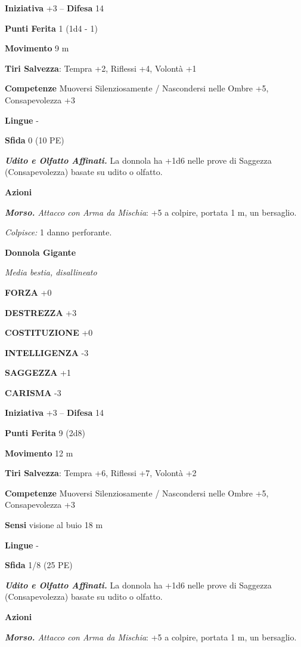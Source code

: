 \begin{multicols}{2}
\textbf{Iniziativa} +3 -- \textbf{Difesa} 14

\textbf{Punti Ferita} 1 (1d4 - 1)

\textbf{Movimento} 9 m

\textbf{Tiri Salvezza}: Tempra +2, Riflessi +4, Volontà +1

\textbf{Competenze} Muoversi Silenziosamente / Nascondersi nelle Ombre +5, Consapevolezza +3

\textbf{Lingue} -

\textbf{Sfida} 0 (10 PE)

\emph{\textbf{Udito e Olfatto Affinati.}} La donnola ha +1d6 nelle prove di Saggezza (Consapevolezza) basate su udito o olfatto.

\textbf{Azioni}

\emph{\textbf{Morso.} Attacco con Arma da Mischia}: +5 a colpire, portata 1 m, un bersaglio.

\emph{Colpisce:} 1 danno perforante.

\medskip\textbf{Donnola Gigante}

\emph{Media bestia, disallineato}

\textbf{FORZA} +0

\textbf{DESTREZZA} +3

\textbf{COSTITUZIONE} +0

\textbf{INTELLIGENZA} -3

\textbf{SAGGEZZA} +1

\textbf{CARISMA} -3

\textbf{Iniziativa} +3 -- \textbf{Difesa} 14

\textbf{Punti Ferita} 9 (2d8)

\textbf{Movimento} 12 m

\textbf{Tiri Salvezza}:  Tempra +6, Riflessi +7, Volontà +2 

\textbf{Competenze} Muoversi Silenziosamente / Nascondersi nelle Ombre +5, Consapevolezza +3

\textbf{Sensi} visione al buio 18 m

\textbf{Lingue} -

\textbf{Sfida} 1/8 (25 PE)

\emph{\textbf{Udito e Olfatto Affinati.}} La donnola ha +1d6 nelle prove di Saggezza (Consapevolezza) basate su udito o olfatto.

\textbf{Azioni}

\emph{\textbf{Morso.} Attacco con Arma da Mischia}: +5 a colpire, portata 1 m, un bersaglio.


\end{multicols}
